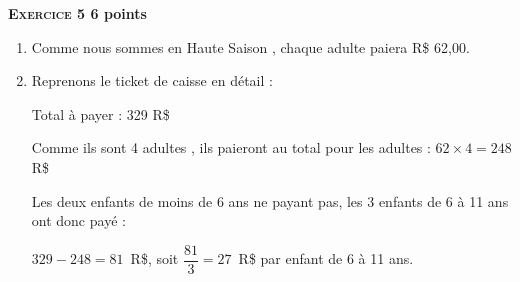 \textbf{\textsc{Exercice 5} \hfill 6 points}

\medskip

\begin{enumerate}
\item Comme nous sommes en \og  Haute Saison \fg, chaque adulte paiera R\$ 62,00.


\item Reprenons le ticket de caisse en détail :

Total à payer : 329 R\$

Comme ils sont 4 adultes , ils paieront au total pour les adultes : $62 \times 4 = 248$ R\$

Les deux enfants de moins de 6 ans ne payant pas, les 3 enfants de 6 à 11 ans ont donc payé :

$329 - 248 = 81$~R\$, soit $\dfrac{81}{3} = 27$~R\$ par enfant de 6 à 11 ans.

\end{enumerate}

\vspace{0,25cm}

